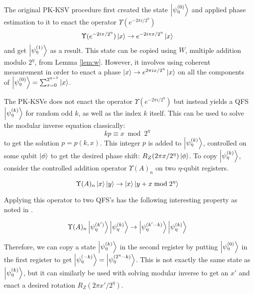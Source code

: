The original PK-KSV procedure first created the state $\left\vert{\psi_{\eta}^{(0)}}\right\rangle$
and applied phase estimation to it to enact the operator
$\Upsilon(e^{-2\pi i / 2^\eta})$
%
\begin{equation}
\Upsilon(e^{-2i \pi / 2^{\eta}})\left\vert{x}\right\rangle \rightarrow e^{-2i\pi x / 2^{\eta}}\left\vert{x}\right\rangle
\end{equation}
%
and get $\left\vert{\psi_{\eta}^{(1)}}\right\rangle$ as a result. This state can be copied using
$W$, multiple addition modulo $2^{\eta}$, from Lemma \ref{lem:w}.
However, it involves using coherent measurement
in order to enact a phase $\left\vert{x}\right\rangle \rightarrow e^{2\pi i x / 2^{\eta}}\left\vert{x}\right\rangle$ on
all the components of $\left\vert{\psi_{\eta}^{(0)}}\right\rangle = \sum_{x = 0}^{2^{\eta-1}} \left\vert{x}\right\rangle$.

The PK-KSVe does not enact the operator $\Upsilon(e^{-2\pi i / 2^{\eta}})$ but instead
yields a QFS $\left\vert{\psi_{\eta}^{(k)}}\right\rangle$ for random odd $k$, as well as the index $k$ itself.
This can be used to solve the modular inverse equation classically:
%
\begin{equation}
kp \equiv x \bmod 2^{\eta}
\end{equation}
%
to get the solution $p = p(k,x)$.
 This integer 
$p$ is added to $\left\vert{\psi_{\eta}^{(k)}}\right\rangle$, controlled on some qubit $\left\vert{\phi}\right\rangle$
to get the desired phase shift: $R_Z(2\pi x / 2^{\eta})\left\vert{\phi}\right\rangle$.
To copy $\left\vert{\psi_{\eta}^{(k)}}\right\rangle$, consider the controlled addition operator $\Upsilon(A)_n$
on two ${\eta}$-qubit registers.

\begin{equation}
\Upsilon(A)_n \left\vert{x}\right\rangle\left\vert{y}\right\rangle \rightarrow \left\vert{x}\right\rangle\left\vert{y + x \bmod 2^{\eta}}\right\rangle
\end{equation}

Applying this operator to two QFS's has the following interesting property
as noted in \cite{Jones2013}.

\begin{equation}
\Upsilon(A)_n \left\vert{\psi_{\eta}^{(k')}}\right\rangle\left\vert{\psi_{\eta}^{(k)}}\right\rangle \rightarrow \left\vert{\psi_{\eta}^{(k'-k)}}\right\rangle\left\vert{\psi_{\eta}^{(k)}}\right\rangle
\end{equation}

Therefore, we can copy a state $\left\vert{\psi_{\eta}^{(k)}}\right\rangle$ in the second register by
putting $\left\vert{\psi_{\eta}^{(0)}}\right\rangle$ in the first register to get
$\left\vert{\psi_{\eta}^{(-k)}}\right\rangle = \left\vert{\psi_{\eta}^{(2^{\eta} - k)}}\right\rangle$.
This is not exactly the same state as $\left\vert{\psi_{\eta}^{(k)}}\right\rangle$,
but it can similarly be used
with solving modular inverse to get an $x'$ and enact a desired rotation $R_Z(2\pi x' / 2^{\eta})$.

